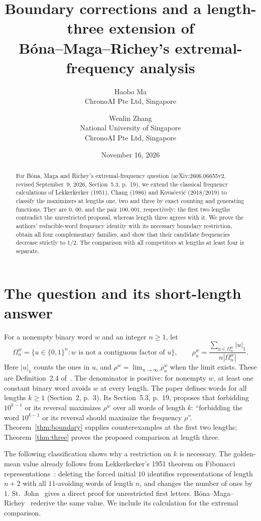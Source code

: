 \documentclass[11pt]{article}
\title{Boundary corrections and a length-three extension of\texorpdfstring{\\}{}
B\'ona--Maga--Richey's extremal-frequency analysis}
\author{Haobo Ma\\\small ChronoAI Pte Ltd, Singapore
\and Wenlin Zhang\\\small National University of Singapore\\\small ChronoAI Pte Ltd, Singapore}
\date{November 16, 2026}
\newcommand{\Om}{\Omega}
\begin{document}
\maketitle
\begin{abstract}
For B\'ona, Maga and Richey's extremal-frequency question
(arXiv:2606.06655v2, revised September~9, 2026, Section~5.3, p.~19),
we extend the classical frequency calculations of Lekkerkerker (1951),
Chang (1986) and Kova\v{c}evi\'c (2018/2019) to classify the maximizers
at lengths one, two and three by exact counting and generating functions.
They are $0$, $00$, and the pair $100,001$, respectively: the first two
lengths contradict the unrestricted proposal, whereas length three agrees
with it. We prove the authors' reducible-word frequency identity with its
necessary boundary restriction, obtain all four complementary families,
and show that their candidate frequencies decrease strictly to $1/2$.
The comparison with all competitors at lengths at least four is separate.
\end{abstract}

\section{The question and its short-length answer}
For a nonempty binary word $w$ and an integer $n\geq1$, let
\[
 \Om_n^w=\{u\in\{0,1\}^n: w\text{ is not a contiguous factor of }u\},
 \qquad
 \rho_n^w=\frac{\sum_{u\in\Om_n^w}|u|_1}{n|\Om_n^w|}.
\]
Here $|u|_1$ counts the ones in $u$, and $\rho^w=\lim_{n\to\infty}\rho_n^w$
when the limit exists. These are Definition~2.4 of~\cite{BMR}.
The denominator is positive: for nonempty $w$, at least one constant binary
word avoids $w$ at every length.
The paper defines words for all lengths $k\geq1$ (Section~2, p.~3).
Its Section~5.3, p.~19, proposes that forbidding $10^{k-1}$ or its reversal
maximizes $\rho^w$ over all words of length $k$: ``forbidding the word
$10^{k-1}$ or its reversal should maximize the frequency $\rho$''.
Theorem~\ref{thm:boundary} supplies counterexamples at the first two lengths;
Theorem~\ref{thm:three} proves the proposed comparison at length three.

The following classification shows why a restriction on $k$ is necessary.
The golden-mean value already follows from Lekkerkerker's 1951 theorem
on Fibonacci representations~\cite[Stelling~B, p.~2]{L}: deleting the
forced initial $10$ identifies representations of length $n+2$ with
all $11$-avoiding words of length $n$, and changes the number of ones by $1$.
St.~John~\cite[Theorem~(2)]{SJ} gives a direct proof for unrestricted first
letters. B\'ona--Maga--Richey~\cite[Example~2.10, Eq.~(2.14)]{BMR}
rederive the same value. We include its calculation for the extremal comparison.
\end{document}
